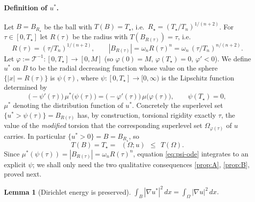 \documentclass[11pt]{amsart}
\newtheorem{lemma}[theorem]{Lemma}
\theoremstyle{definition}
\newcommand{\Om}{\Omega}
\newcommand{\abs}[1]{\left|#1\right|}
\newcommand{\dx}{\,dx}
\DeclareMathOperator{\Tmod}{T_{\mathrm{mod}}}
\begin{document}
\paragraph{Definition of $u^*$.}
Let $B=B_{R_\star}$ be the ball with $T(B)=T_\star$, i.e.\
$R_\star=(T_\star/T_n)^{1/(n+2)}$. For $\tau\in[0,T_\star]$ let $R(\tau)$ be
the radius with $T(B_{R(\tau)})=\tau$, i.e.\
\begin{equation}\label{eq:Rtau}
  R(\tau)=(\tau/T_n)^{1/(n+2)},\qquad
  \abs{B_{R(\tau)}}=\omega_n R(\tau)^n
  =\omega_n\,(\tau/T_n)^{n/(n+2)}.
\end{equation}
Let $\varphi:=\mathcal T^{-1}:[0,T_\star]\to[0,M]$ (so $\varphi(0)=M$,
$\varphi(T_\star)=0$, $\varphi'<0$). We define $u^*$ on $B$ to be the radial
decreasing function whose value on the sphere $\{\abs x=R(\tau)\}$ is
$\psi(\tau)$, where $\psi:[0,T_\star]\to[0,\infty)$ is the
Lipschitz function determined by
\begin{equation}\label{eq:psi-ode}
  \bigl(-\psi'(\tau)\bigr)\,\mu^*\!\bigl(\psi(\tau)\bigr)
  =\bigl(-\varphi'(\tau)\bigr)\,\mu\!\bigl(\varphi(\tau)\bigr),
  \qquad \psi(T_\star)=0,
\end{equation}
$\mu^*$ denoting the distribution function of $u^*$. Concretely the
superlevel set $\{u^*>\psi(\tau)\}=B_{R(\tau)}$ has, by construction,
torsional rigidity exactly $\tau$, the value of the \emph{modified}
torsion that the corresponding superlevel set $\Om_{\varphi(\tau)}$ of $u$
carries. In particular $\{u^*>0\}=B=B_{R_\star}$, so
\begin{equation}\label{eq:TB}
  T(B)=T_\star=\Tmod(\Om;u)\ \ \le\ \ T(\Om).
\end{equation}
Since $\mu^*(\psi(\tau))=\abs{B_{R(\tau)}}=\omega_n R(\tau)^n$, equation
\eqref{eq:psi-ode} integrates to an explicit $\psi$; we shall only need the
two qualitative consequences \ref{prop:A}, \ref{prop:B}, proved next.

\begin{lemma}[Dirichlet energy is preserved]\label{lem:A}
$\displaystyle\int_B\abs{\nabla u^*}^2\dx=\int_\Om\abs{\nabla u}^2\dx$.
\end{lemma}
\end{document}
